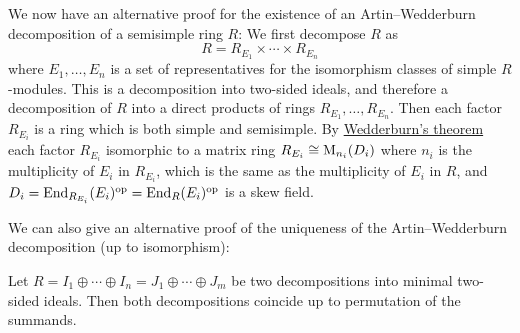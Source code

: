 \begin{fluff}
  We now have an alternative proof for the existence of an Artin--Wedderburn decomposition of a semisimple ring $R$:
  We first decompose $R$ as
  \[
      R
    = R_{E_1} \times \dotsb \times R_{E_n}
  \]
  where $E_1, \dotsc, E_n$ is a set of representatives for the isomorphism classes of simple $R$-modules.
  This is a decomposition into two-sided ideals, and therefore a decomposition of $R$ into a direct products of rings $R_{E_1}, \dotsc, R_{E_n}$.
  Then each factor $R_{E_i}$ is a ring which is both simple and semisimple.
  By \hyperref[theorem: wedderburns theorem]{Wedderburn’s theorem} each factor $R_{E_i}$ isomorphic to a matrix ring $R_{E_i} \cong \operatorname{M}_{n_i}(D_i)$ where $n_i$ is the multiplicity of $E_i$ in $R_{E_i}$, which is the same as the multiplicity of $E_i$ in $R$, and $D_i = \operatorname{End}_{R_{E_i}}(E_i)^{\operatorname{op}} = \operatorname{End}_R(E_i)^{\operatorname{op}}$ is a skew field.
  
  We can also give an alternative proof of the uniqueness of the Artin--Wedderburn decomposition (up to isomorphism):
\end{fluff}


\begin{lemma}
  \label{lemma: uniqueness of decompositon into simple rings}
  Let $R = I_1 \oplus \dotsb \oplus I_n = J_1 \oplus \dotsb \oplus J_m$ be two decompositions into minimal two-sided ideals.
  Then both decompositions coincide up to permutation of the summands.
\end{lemma}


